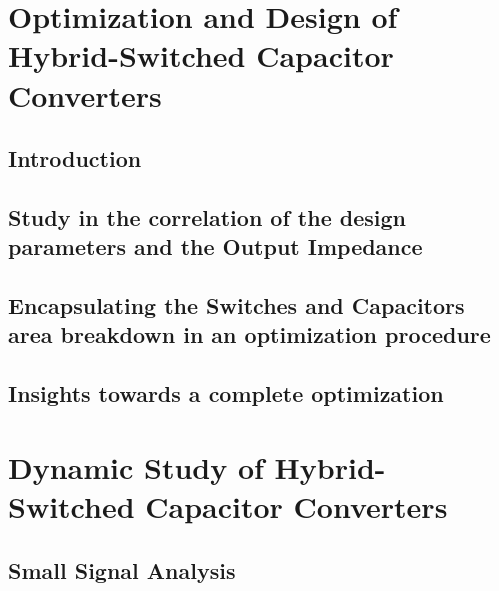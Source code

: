 \chapter[Optimization and Design]{Optimization and Design of Hybrid-Switched Capacitor Converters}
\section{Introduction}
\section{Study in the correlation of the design parameters and the Output Impedance}
\section{Encapsulating the Switches and Capacitors area breakdown in an optimization procedure}
\section{Insights towards a complete optimization}

\chapter[Dynamic Study]{Dynamic Study of Hybrid-Switched Capacitor Converters}
\section{Small Signal Analysis}